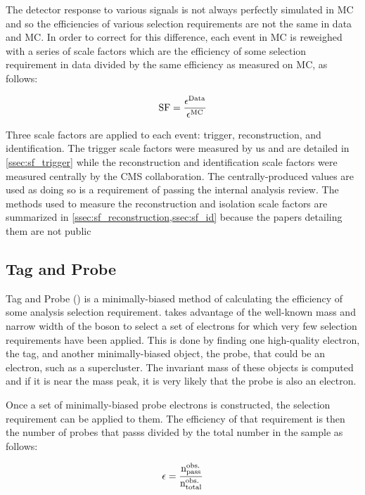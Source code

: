 The detector response to various signals is not always perfectly simulated in
MC and so the efficiencies of various selection requirements are not the same
in data and MC. In order to correct for this difference, each event in MC is
reweighed with a series of scale factors which are the efficiency of some
selection requirement in data divided by the same efficiency as measured on MC,
as follows:

\begin{equation}
    \label{eq:sf}
    \text{SF} = \frac{\epsilon^{\text{Data}}}{\epsilon^{\text{MC}}}
\end{equation}

Three scale factors are applied to each event: trigger, reconstruction, and
identification. The trigger scale factors were measured by us and are detailed
in \cref{ssec:sf_trigger} while the reconstruction and identification scale
factors were measured centrally by the CMS collaboration. The
centrally-produced values are used as doing so is a requirement of passing the
internal analysis review. The methods used to measure the reconstruction and
isolation scale factors are summarized in
\cref{ssec:sf_reconstruction,ssec:sf_id} because the papers detailing them are
not public

\subsection{Tag and Probe}

Tag and Probe (\TnP) is a minimally-biased method of calculating the efficiency
of some analysis selection requirement. \TnP takes advantage of the well-known
mass and narrow width of the \Z boson to select a set of electrons for which
very few selection requirements have been applied. This is done by finding one
high-quality electron, the tag, and another minimally-biased object, the probe,
that could be an electron, such as a supercluster. The invariant mass of these
objects is computed and if it is near the \Z mass peak, it is very likely that
the probe is also an electron.

Once a set of minimally-biased probe electrons is constructed, the selection
requirement can be applied to them. The efficiency of that requirement is then
the number of probes that passs divided by the total number in the sample as
follows:

\begin{equation}
    \label{eq:eff}
    \epsilon = \frac{
        \text{n}^{\text{obs.}}_{\text{pass}}
    }{
        \text{n}^{\text{obs.}}_{\text{total}}
    }
\end{equation}

